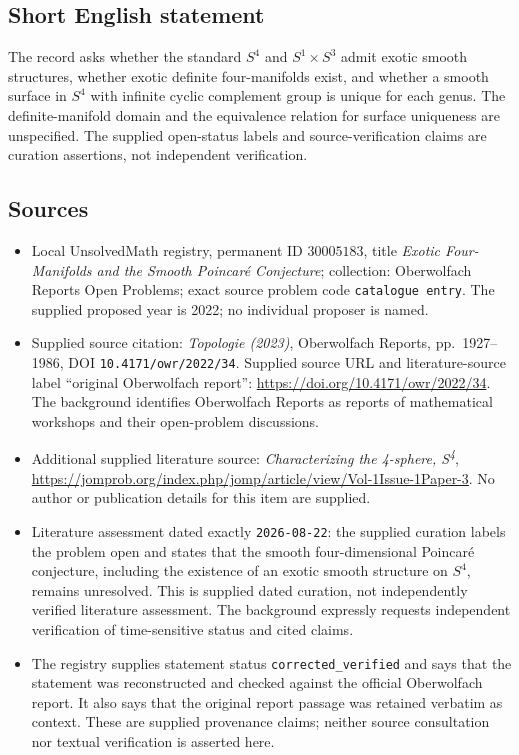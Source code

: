 \documentclass[11pt]{article}
\begin{document}
\subsection{Short English statement}
The record asks whether the standard \(S^4\) and \(S^1\times S^3\) admit exotic smooth structures, whether exotic definite four-manifolds exist, and whether a smooth surface in \(S^4\) with infinite cyclic complement group is unique for each genus. The definite-manifold domain and the equivalence relation for surface uniqueness are unspecified. The supplied open-status labels and source-verification claims are curation assertions, not independent verification.
\subsection{Sources}
\begin{itemize}
\item Local UnsolvedMath registry, permanent ID \(30005183\), title \emph{Exotic Four-Manifolds and the Smooth Poincar\'e Conjecture}; collection: Oberwolfach Reports Open Problems; exact source problem code \texttt{catalogue entry}. The supplied proposed year is 2022; no individual proposer is named.
\item Supplied source citation: \emph{Topologie (2023)}, Oberwolfach Reports, pp.~1927--1986, DOI \texttt{10.4171/owr/2022/34}. Supplied source URL and literature-source label ``original Oberwolfach report'': \url{https://doi.org/10.4171/owr/2022/34}. The background identifies Oberwolfach Reports as reports of mathematical workshops and their open-problem discussions.
\item Additional supplied literature source: \emph{Characterizing the 4-sphere, S\textsuperscript{4}}, \url{https://jomprob.org/index.php/jomp/article/view/Vol-1Issue-1Paper-3}. No author or publication details for this item are supplied.
\item Literature assessment dated exactly \texttt{2026-08-22}: the supplied curation labels the problem open and states that the smooth four-dimensional Poincar\'e conjecture, including the existence of an exotic smooth structure on \(S^4\), remains unresolved. This is supplied dated curation, not independently verified literature assessment. The background expressly requests independent verification of time-sensitive status and cited claims.
\item The registry supplies statement status \texttt{corrected\_verified} and says that the statement was reconstructed and checked against the official Oberwolfach report. It also says that the original report passage was retained verbatim as context. These are supplied provenance claims; neither source consultation nor textual verification is asserted here.
\end{itemize}
\end{document}

